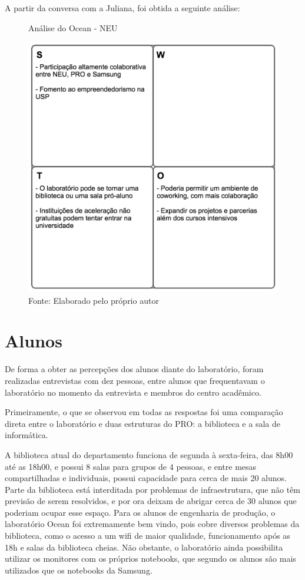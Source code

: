 A partir da conversa com a Juliana, foi obtida a seguinte análise:

\begin{figure}[H]
\caption{Análise do Ocean - NEU}
\centerline{\includegraphics[scale=0.75]{img/neuswot}}
\label{fig:swotneu}
\caption* {Fonte: Elaborado pelo próprio autor}
\end{figure}

\section{Alunos}

De forma a obter as percepções dos alunos diante do laboratório, foram realizadas entrevistas com dez pessoas, entre alunos que frequentavam o laboratório no momento da entrevista e membros do centro acadêmico.

Primeiramente, o que se observou em todas as respostas foi uma comparação direta entre o laboratório e duas estruturas do PRO: a biblioteca e a sala de informática. 

A biblioteca atual do departamento funciona de segunda à sexta-feira, das 8h00 até as 18h00, e possui 8 salas para grupos de 4 pessoas, e entre mesas compartilhadas e individuais, possui capacidade para cerca de mais 20 alunos. Parte da biblioteca está interditada por problemas de infraestrutura, que não têm previsão de serem resolvidos, e por ora deixam de abrigar cerca de 30 alunos que poderiam ocupar esse espaço. Para os alunos de engenharia de produção, o laboratório Ocean foi extremamente bem vindo, pois cobre diversos problemas da biblioteca, como o acesso a um wifi de maior qualidade, funcionamento após as 18h e salas da biblioteca cheias. Não obstante, o laboratório ainda possibilita utilizar os monitores com os próprios notebooks, que segundo os alunos são mais utilizados que os notebooks da Samsung.

